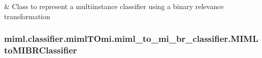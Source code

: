 \documentclass[letterpaper,10pt,english]{sphinxmanual}
\begin{document}
\begin{savenotes}\sphinxattablestart
\sphinxthistablewithglobalstyle
\sphinxthistablewithnovlinesstyle
\centering
\begin{tabulary}{\linewidth}[t]{}
\sphinxtoprule
\sphinxtableatstartofbodyhook
\sphinxAtStartPar
{\hyperref[\detokenize{classifier/mimlTOmi/_autosummary/miml.classifier.mimlTOmi.miml_to_mi_br_classifier.MIMLtoMIBRClassifier:miml.classifier.mimlTOmi.miml_to_mi_br_classifier.MIMLtoMIBRClassifier}]{}}
&
\sphinxAtStartPar
Class to represent a multi\sphinxhyphen{}instance classifier using a binary relevance transformation
\\
\sphinxbottomrule
\end{tabulary}
\sphinxtableafterendhook\par
\sphinxattableend\end{savenotes}

\sphinxstepscope


\subsubsection{miml.classifier.mimlTOmi.miml\_to\_mi\_br\_classifier.MIMLtoMIBRClassifier}
\label{\detokenize{classifier/mimlTOmi/_autosummary/miml.classifier.mimlTOmi.miml_to_mi_br_classifier.MIMLtoMIBRClassifier:miml-classifier-mimltomi-miml-to-mi-br-classifier-mimltomibrclassifier}}\label{\detokenize{classifier/mimlTOmi/_autosummary/miml.classifier.mimlTOmi.miml_to_mi_br_classifier.MIMLtoMIBRClassifier::doc}}
\end{document}
